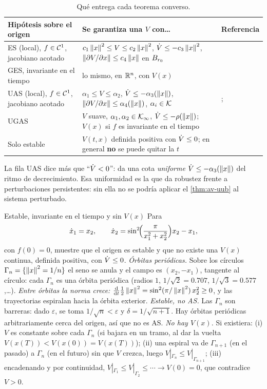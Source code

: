 \begin{table}[ht]
\centering\small
\begin{tabular}{@{}p{3.4cm}p{6.0cm}p{2.6cm}@{}}
\toprule
Hipótesis sobre el origen & Se garantiza una $V$ con\ldots & Referencia\\
\midrule
ES (local), $f\in\mathcal{C}^{1}$, jacobiano acotado & $c_1\left\lVert x\right\rVert^2\le V\le c_2\left\lVert x\right\rVert^2$, $\dot V\le-c_3\left\lVert x\right\rVert^2$, $\left\lVert \partial V/\partial x\right\rVert\le c_4\left\lVert x\right\rVert$ en $B_{r_0}$ & \cite[Teo.~4.14]{Kha02}\\
GES, invariante en el tiempo & lo mismo, en $\mathbb{R}^n$, con $V(x)$ & \cite[Teo.~2.32]{KeBr23}\\
UAS (local), $f\in\mathcal{C}^{1}$, jacobiano acotado & $\alpha_1\le V\le\alpha_2$, $\dot V\le-\alpha_3(\left\lVert x\right\rVert)$, $\left\lVert \partial V/\partial x\right\rVert\le\alpha_4(\left\lVert x\right\rVert)$, $\alpha_i\in\mathcal{K}$ & \cite{Mas56}; \cite[Teo.~4.16]{Kha02}\\
UGAS & $V$ suave, $\alpha_1,\alpha_2\in\mathcal{K}_{\infty}$, $\dot V\le-\rho(\left\lVert x\right\rVert)$; $V(x)$ si $f$ es invariante en el tiempo & \cite[Teo.~2.31]{KeBr23}\\
Solo estable & $V(t,x)$ definida positiva con $\dot V\le0$; en general \textbf{no} se puede quitar la $t$ & \cite[\S2.5.1]{KeBr23}\\
\bottomrule
\end{tabular}
\caption{Qué entrega cada teorema converso.}
\label{tab:av-conversos}
\end{table}

La fila UAS dice más que ``$\dot V<0$'': da una cota \emph{uniforme} $\dot V\le-\alpha_3(\left\lVert x\right\rVert)$ del ritmo de decrecimiento. Esa uniformidad es la que da robustez frente a perturbaciones persistentes: sin ella no se podría aplicar el \cref{thm:av-uub} al sistema perturbado.

\begin{ejemplo}[label=ej:av-sinV]{Estable, invariante en el tiempo y sin $V(x)$ \citep[ec.~(2.51)]{KeBr23}}
Para
\[
  \dot x_1=x_2,\qquad\dot x_2=\sin^2\!\Bigl(\frac{\pi}{x_1^2+x_2^2}\Bigr)x_2-x_1 ,
\]
con $f(0)=0$, muestre que el origen es estable y que no existe una $V(x)$ continua, definida positiva, con $\dot V\le0$.
\solucion \emph{Órbitas periódicas.} Sobre los círculos $\Gamma_n=\{\left\lVert x\right\rVert^2=1/n\}$ el seno se anula y el campo es $(x_2,-x_1)$, tangente al círculo: cada $\Gamma_n$ es una órbita periódica (radios $1$, $1/\sqrt2=0.707$, $1/\sqrt3=0.577$,\ldots).
\emph{Entre órbitas la norma crece:} $\frac{\mathrm{d}}{\mathrm{d} t}\tfrac12\left\lVert x\right\rVert^2=\sin^2(\pi/\left\lVert x\right\rVert^2)\,x_2^2\ge0$, y las trayectorias espiralan hacia la órbita exterior.
\emph{Estable, no AS.} Las $\Gamma_n$ son barreras: dado $\varepsilon$, se toma $1/\sqrt n<\varepsilon$ y $\delta=1/\sqrt{n+1}$. Hay órbitas periódicas arbitrariamente cerca del origen, así que no es AS.
\emph{No hay $V(x)$.} Si existiera: (i) $V$ es constante sobre cada $\Gamma_n$ (si bajara en un tramo, al dar la vuelta $V(x(T))<V(x(0))=V(x(T))$); (ii) una espiral va de $\Gamma_{n+1}$ (en el pasado) a $\Gamma_n$ (en el futuro) sin que $V$ crezca, luego $V|_{\Gamma_n}\le V|_{\Gamma_{n+1}}$; (iii) encadenando y por continuidad, $V|_{\Gamma_1}\le V|_{\Gamma_2}\le\cdots\to V(0)=0$, que contradice $V>0$.
\end{ejemplo}


